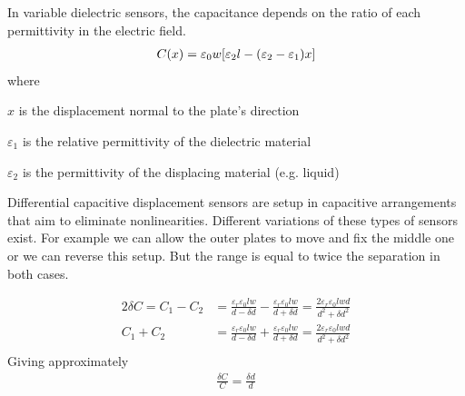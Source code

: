 In variable dielectric sensors, the capacitance depends on the ratio of each permittivity in the electric field.
\begin{align}
   C(x) &= \varepsilon_0 w \bqty{\varepsilon_2 l - \pqty{\varepsilon_2-\varepsilon_1}x}\label{eqn:var_diel_displace}\\
\end{align}
where
\begin{description}[topsep=0ex, noitemsep]
    \item $x$ is the displacement normal to the plate's direction
    \item $\varepsilon_1$ is the relative permittivity of the dielectric material
    \item $\varepsilon_2$ is the permittivity of the displacing material (e.g. liquid)
\end{description}
Differential capacitive displacement sensors are setup in capacitive arrangements that aim to eliminate nonlinearities. Different variations of these types of sensors exist. For example we can allow the outer plates to move and fix the middle one or we can reverse this setup. But the range is equal to twice the separation in both cases.

\begin{align}
    2\delta C = C_1-C_2 &= \frac{\varepsilon_r\varepsilon_0 lw}{d-\delta d} - \frac{\varepsilon_r\varepsilon_0 lw}{d+\delta d} = \frac{2\varepsilon_r\varepsilon_0 lwd}{d^2+\delta d^2}\\
    C_1+C_2 &= \frac{\varepsilon_r\varepsilon_0 lw}{d-\delta d} + \frac{\varepsilon_r\varepsilon_0 lw}{d+\delta d} = \frac{2\varepsilon_r\varepsilon_0 lwd}{d^2+\delta d^2}\\
\end{align}
Giving approximately
\begin{align}
    \frac{\delta C}{C} = \frac{\delta d}{d}
\end{align}

